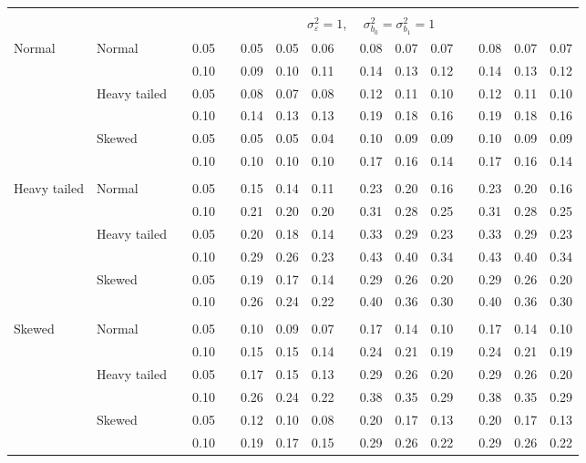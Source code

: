 \documentclass{article} %
\begin{document}
\begin{table}[ht]
\begin{scriptsize}
\begin{center}
\begin{tabular}{ll p{.1cm} c p{.1cm} rrr p{.1cm} rrr p{.1cm} rrr}
&&&&&&&&&&&&&&&\\
& && && \multicolumn{9}{c}{$\sigma_{\varepsilon}^2 = 1$, \ \ $\sigma_{b_0}^2 = \sigma_{b_1}^2 = 1$} \\ \cline{6-16}
Normal       & Normal       && 0.05 &&  0.05 & 0.05 & 0.06 && 0.08 & 0.07 & 0.07 && 0.08 & 0.07 & 0.07 \\ 
             &              && 0.10 &&  0.09 & 0.10 & 0.11 && 0.14 & 0.13 & 0.12 && 0.14 & 0.13 & 0.12 \\ 
             & Heavy tailed && 0.05 &&  0.08 & 0.07 & 0.08 && 0.12 & 0.11 & 0.10 && 0.12 & 0.11 & 0.10 \\ 
             &              && 0.10 &&  0.14 & 0.13 & 0.13 && 0.19 & 0.18 & 0.16 && 0.19 & 0.18 & 0.16 \\ 
             & Skewed       && 0.05 &&  0.05 & 0.05 & 0.04 && 0.10 & 0.09 & 0.09 && 0.10 & 0.09 & 0.09 \\ 
             &              && 0.10 &&  0.10 & 0.10 & 0.10 && 0.17 & 0.16 & 0.14 && 0.17 & 0.16 & 0.14 \\ 
             &&&&&&&&&&&&&&&\\
Heavy tailed & Normal       && 0.05 &&  0.15 & 0.14 & 0.11 && 0.23 & 0.20 & 0.16 && 0.23 & 0.20 & 0.16 \\ 
             &              && 0.10 &&  0.21 & 0.20 & 0.20 && 0.31 & 0.28 & 0.25 && 0.31 & 0.28 & 0.25 \\ 
             & Heavy tailed && 0.05 &&  0.20 & 0.18 & 0.14 && 0.33 & 0.29 & 0.23 && 0.33 & 0.29 & 0.23 \\ 
             &              && 0.10 &&  0.29 & 0.26 & 0.23 && 0.43 & 0.40 & 0.34 && 0.43 & 0.40 & 0.34 \\ 
             & Skewed       && 0.05 &&  0.19 & 0.17 & 0.14 && 0.29 & 0.26 & 0.20 && 0.29 & 0.26 & 0.20 \\ 
             &              && 0.10 &&  0.26 & 0.24 & 0.22 && 0.40 & 0.36 & 0.30 && 0.40 & 0.36 & 0.30 \\ 
             &&&&&&&&&&&&&&&\\
Skewed       & Normal       && 0.05 &&  0.10 & 0.09 & 0.07 && 0.17 & 0.14 & 0.10 && 0.17 & 0.14 & 0.10 \\ 
             &              && 0.10 &&  0.15 & 0.15 & 0.14 && 0.24 & 0.21 & 0.19 && 0.24 & 0.21 & 0.19 \\ 
             & Heavy tailed && 0.05 &&  0.17 & 0.15 & 0.13 && 0.29 & 0.26 & 0.20 && 0.29 & 0.26 & 0.20 \\ 
             &              && 0.10 &&  0.26 & 0.24 & 0.22 && 0.38 & 0.35 & 0.29 && 0.38 & 0.35 & 0.29 \\ 
             & Skewed       && 0.05 &&  0.12 & 0.10 & 0.08 && 0.20 & 0.17 & 0.13 && 0.20 & 0.17 & 0.13 \\ 
             &              && 0.10 &&  0.19 & 0.17 & 0.15 && 0.29 & 0.26 & 0.22 && 0.29 & 0.26 & 0.22 \\ 



\end{tabular}
\end{center}
\end{scriptsize}
\end{table}
\end{document}
